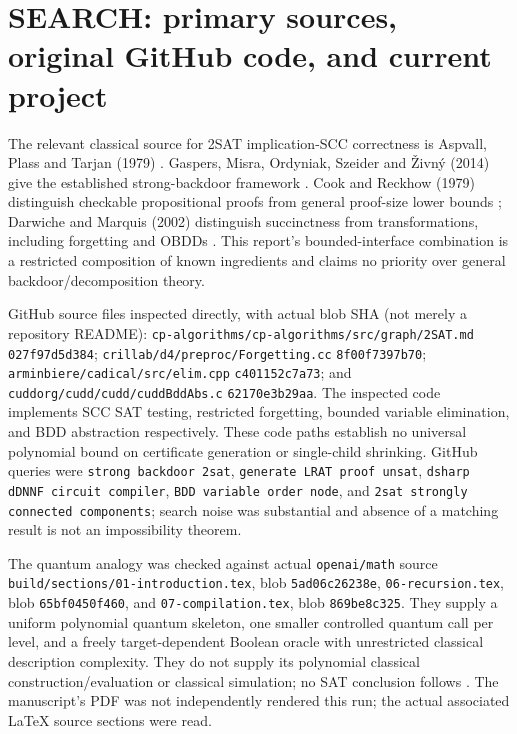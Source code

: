 \documentclass[11pt]{article}
\begin{document}
\section{SEARCH: primary sources, original GitHub code, and current project}
The relevant classical source for 2SAT implication-SCC correctness is Aspvall, Plass and Tarjan (1979) \cite{apt}. Gaspers, Misra, Ordyniak, Szeider and \v{Z}ivn\'y (2014) give the established strong-backdoor framework \cite{gaspers}. Cook and Reckhow (1979) distinguish checkable propositional proofs from general proof-size lower bounds \cite{cr}; Darwiche and Marquis (2002) distinguish succinctness from transformations, including forgetting and OBDDs \cite{dm}. This report's bounded-interface combination is a restricted composition of known ingredients and claims no priority over general backdoor/decomposition theory.

GitHub source files inspected directly, with actual blob SHA (not merely a repository README): \texttt{cp-algorithms/cp-algorithms/src/graph/2SAT.md} \texttt{027f97d5d384}; \texttt{crillab/d4/preproc/Forgetting.cc} \texttt{8f00f7397b70}; \texttt{arminbiere/cadical/src/elim.cpp} \texttt{c401152c7a73}; and \texttt{cuddorg/cudd/cudd/cuddBddAbs.c} \texttt{62170e3b29aa}. The inspected code implements SCC SAT testing, restricted forgetting, bounded variable elimination, and BDD abstraction respectively. These code paths establish no universal polynomial bound on certificate generation or single-child shrinking. GitHub queries were \texttt{strong backdoor 2sat}, \texttt{generate LRAT proof unsat}, \texttt{dsharp dDNNF circuit compiler}, \texttt{BDD variable order node}, and \texttt{2sat strongly connected components}; search noise was substantial and absence of a matching result is not an impossibility theorem.

The quantum analogy was checked against actual \texttt{openai/math} source \texttt{build/sections/01-introduction.tex}, blob \texttt{5ad06c26238e}, \texttt{06-recursion.tex}, blob \texttt{65bf0450f460}, and \texttt{07-compilation.tex}, blob \texttt{869be8c325}. They supply a uniform polynomial quantum skeleton, one smaller controlled quantum call per level, and a freely target-dependent Boolean oracle with unrestricted classical description complexity. They do not supply its polynomial classical construction/evaluation or classical simulation; no SAT conclusion follows \cite{oaipreprint}. The manuscript's PDF was not independently rendered this run; the actual associated LaTeX source sections were read.
\end{document}

